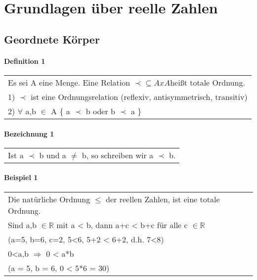 \documentclass[a4paper]{scrartcl}
\begin{document}
\section{Grundlagen über reelle Zahlen}

\subsection{Geordnete Körper}

\paragraph{Definition 1}
\begin{tabbing}
\begin{tabular}{l}
Es sei A eine Menge. Eine Relation $ \prec \subseteq  AxA $heißt totale Ordnung.\\
1) $ \prec $ ist eine Ordnungsrelation (reflexiv, antisymmetrisch, transitiv)\\
2) $ \forall $ a,b $ \in $ A $ \lbrace $ a $ \prec $ b oder b $ \prec $ a $ \rbrace $
\end{tabular}
\end{tabbing}

\paragraph{Bezeichnung 1}
\begin{tabbing}
\begin{tabular}{l}
Ist a $ \prec $ b und a $ \neq $ b, so schreiben wir a $ \prec $ b.
\end{tabular}
\end{tabbing}

\paragraph{Beispiel 1}
\begin{tabbing}
\begin{tabular}{l}
Die natürliche Ordnung $ \leq $ der reellen Zahlen, ist eine totale Ordnung.\\
Sind a,b $ \in \mathbb{R} $ mit a < b, dann a+c < b+c für alle c $ \in \mathbb{R}$\\
(a=5, b=6, c=2, 5<6, 5+2 < 6+2, d.h. 7<8)\\
0<a,b $ \Rightarrow $ 0 < a*b\\
(a = 5, b = 6, 0 < 5*6 = 30)
\end{tabular}
\end{tabbing}
\end{document}
